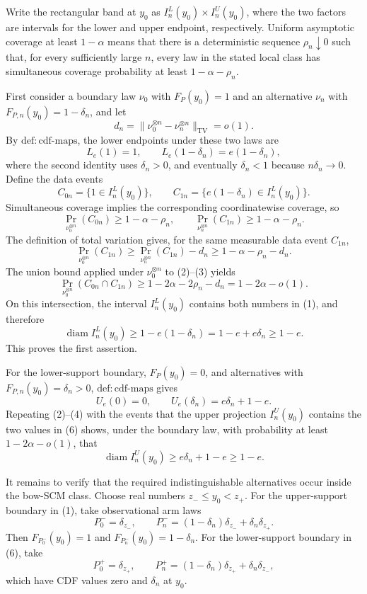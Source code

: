 Write the rectangular band at \(y_0\) as \(I_n^L(y_0)\times I_n^U(y_0)\), where the two factors are intervals for the lower and upper endpoint, respectively.  Uniform asymptotic coverage at least \(1-\alpha\) means that there is a deterministic sequence \(\rho_n\downarrow0\) such that, for every sufficiently large \(n\), every law in the stated local class has simultaneous coverage probability at least \(1-\alpha-\rho_n\).

First consider a boundary law \(\nu_0\) with \(F_P(y_0)=1\) and an alternative \(\nu_n\) with \(F_{P,n}(y_0)=1-\delta_n\), and let
\[
 d_n=\|\nu_0^{\otimes n}-\nu_n^{\otimes n}\|_{\mathrm{TV}}=o(1).
\]
By \(\mathrm{def:cdf\text{-}maps}\), the lower endpoints under these two laws are
\[
 L_e(1)=1,
 \qquad
 L_e(1-\delta_n)=e(1-\delta_n), \tag{1}
\]
where the second identity uses \(\delta_n>0\), and eventually \(\delta_n<1\) because \(n\delta_n\to0\).  Define the data events
\[
 C_{0n}=\{1\in I_n^L(y_0)\},
 \qquad
 C_{1n}=\{e(1-\delta_n)\in I_n^L(y_0)\}.
\]
Simultaneous coverage implies the corresponding coordinatewise coverage, so
\[
 \Pr_{\nu_0^{\otimes n}}(C_{0n})\ge1-\alpha-\rho_n,
 \qquad
 \Pr_{\nu_n^{\otimes n}}(C_{1n})\ge1-\alpha-\rho_n. \tag{2}
\]
The definition of total variation gives, for the same measurable data event \(C_{1n}\),
\[
 \Pr_{\nu_0^{\otimes n}}(C_{1n})
 \ge \Pr_{\nu_n^{\otimes n}}(C_{1n})-d_n
 \ge1-\alpha-\rho_n-d_n. \tag{3}
\]
The union bound applied under \(\nu_0^{\otimes n}\) to (2)--(3) yields
\[
 \Pr_{\nu_0^{\otimes n}}(C_{0n}\cap C_{1n})
 \ge1-2\alpha-2\rho_n-d_n
 =1-2\alpha-o(1). \tag{4}
\]
On this intersection, the interval \(I_n^L(y_0)\) contains both numbers in (1), and therefore
\[
 \operatorname{diam} I_n^L(y_0)
 \ge 1-e(1-\delta_n)
 =1-e+e\delta_n
 \ge1-e. \tag{5}
\]
This proves the first assertion.

For the lower-support boundary, \(F_P(y_0)=0\), and alternatives with \(F_{P,n}(y_0)=\delta_n>0\), \(\mathrm{def:cdf\text{-}maps}\) gives
\[
 U_e(0)=0,
 \qquad
 U_e(\delta_n)=e\delta_n+1-e. \tag{6}
\]
Repeating (2)--(4) with the events that the upper projection \(I_n^U(y_0)\) contains the two values in (6) shows, under the boundary law, with probability at least \(1-2\alpha-o(1)\), that
\[
 \operatorname{diam} I_n^U(y_0)
 \ge e\delta_n+1-e
 \ge1-e. \tag{7}
\]

It remains to verify that the required indistinguishable alternatives occur inside the bow-SCM class.  Choose real numbers \(z_-\le y_0<z_+\).  For the upper-support boundary in (1), take observational arm laws
\[
 P_0^- =\delta_{z_-},
 \qquad
 P_n^-=(1-\delta_n)\delta_{z_-}+\delta_n\delta_{z_+}. \tag{8}
\]
Then \(F_{P_0^-}(y_0)=1\) and \(F_{P_n^-}(y_0)=1-\delta_n\).  For the lower-support boundary in (6), take
\[
 P_0^+=\delta_{z_+},
 \qquad
 P_n^+=(1-\delta_n)\delta_{z_+}+\delta_n\delta_{z_-}, \tag{9}
\]
which have CDF values zero and \(\delta_n\) at \(y_0\).

